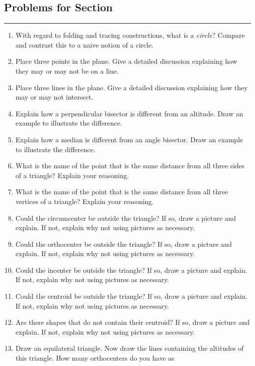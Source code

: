 \newpage



\subsection*{Problems for Section~\thesection}\hrule\vspace{1ex}
\begin{enumerate}
\item With regard to folding and tracing constructions, what is a \textit{circle}?
  Compare and contrast this to a naive notion of a circle.
\item Place three points in the plane. Give a detailed discussion
  explaining how they may or may not be on a line.
\item Place three lines in the plane. Give a detailed discussion explaining
  how they may or may not intersect.
\item Explain how a perpendicular bisector is different from an
  altitude. Draw an example to illustrate the difference.
\item Explain how a median is different from an angle bisector.  Draw an
  example to illustrate the difference.
\item What is the name of the point that is the same distance from all
  three sides of a triangle? Explain your reasoning.
\item What is the name of the point that is the same distance from all
  three vertices of a triangle? Explain your reasoning.
\item Could the circumcenter be outside the triangle? If so, draw a
  picture and explain. If not, explain why not using pictures as
  necessary.
\item Could the orthocenter be outside the triangle? If so, draw a
  picture and explain. If not, explain why not using pictures as
  necessary.
\item Could the incenter be outside the triangle? If so, draw a
  picture and explain. If not, explain why not using pictures as
  necessary.
\item Could the centroid be outside the triangle? If so, draw a
  picture and explain. If not, explain why not using pictures as
  necessary.
\item Are there shapes that do not contain their centroid? If so, draw
  a picture and explain. If not, explain why not using pictures as
  necessary.
\item Draw an equilateral triangle. Now draw the lines containing the
  altitudes of this triangle. How many orthocenters do you have as

\end{enumerate}
